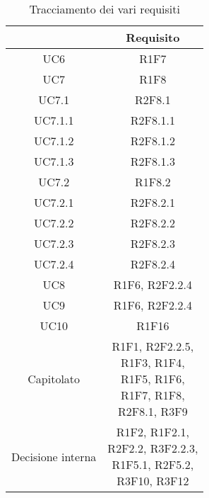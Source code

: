 \begin{table}[H]
	\centering
	\renewcommand{\arraystretch}{1.8}
	\begin{tabular}{c | c}
		\rowcolor[HTML]{125E28}
		\multicolumn{1}{c}{\color[HTML]{FFFFFF} \textbf{Fonte}} &
		\multicolumn{1}{c}{\color[HTML]{FFFFFF} \textbf{Requisito}}                                \\
		\hline
		UC6                                                     & R1F7                             \\ \hline
		UC7                                                     & R1F8                             \\ \hline
		UC7.1                                                   & R2F8.1                           \\ \hline
		UC7.1.1                                                 & R2F8.1.1                         \\ \hline
		UC7.1.2                                                 & R2F8.1.2                         \\ \hline
		UC7.1.3                                                 & R2F8.1.3                         \\ \hline
		UC7.2                                                   & R1F8.2                           \\ \hline
		UC7.2.1                                                 & R2F8.2.1                         \\ \hline
		UC7.2.2                                                 & R2F8.2.2                         \\ \hline
		UC7.2.3                                                 & R2F8.2.3                         \\ \hline
		UC7.2.4                                                 & R2F8.2.4                         \\ \hline
		UC8                                                     & R1F6, R2F2.2.4                   \\ \hline
		UC9														& R1F6, R2F2.2.4				   \\ \hline
		UC10													& R1F16							   \\ \hline
		Capitolato                                              & \Shortunderstack{R1F1, R2F2.2.5, \\R1F3, R1F4, \\R1F5, R1F6, \\R1F7, R1F8,\\ R2F8.1, R3F9\\}  \\ \hline
		Decisione interna                                       & \Shortunderstack{R1F2,  R1F2.1,  \\R2F2.2, R3F2.2.3,\\ R1F5.1, R2F5.2,\\ R3F10, R3F12\\} \\
	\end{tabular}
	\caption{Tracciamento dei vari requisiti}
\end{table}


